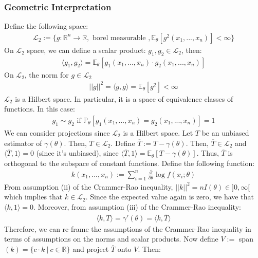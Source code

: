 \documentclass[11pt]{scrartcl}
\newcommand{\R}[0]{\mathbb{R}}
\theoremstyle{definition}
\theoremstyle{remark}
\newcommand{\EXth}[1]{\mathbb{E}_\theta \left[ #1 \right]}
\newcommand{\Ltwo}[0]{\mathcal{L}_2}
\begin{document}
{\subsubsection{Geometric Interpretation}
Define the following space: 
\begin{align*} 
	\mathcal{L}_2 := \{ g: \R^n \rightarrow \R, \text{ borel measurable }, \EXth{g^2(x_1,..., x_n)} < \infty  \} 
\end{align*}
On $\Ltwo$ space, we can define a scalar product: $g_1, g_2 \in \Ltwo$, then: 
\begin{align*}
	\langle g_1, g_2 \rangle = \EXth{g_1(x_1, ..., x_n) \cdot g_2 (x_1, ..., x_n) }	
\end{align*}
On $\Ltwo$, the norm for $g \in \Ltwo$
\begin{align*}
		||g||^2 = \langle g, g \rangle = \EXth{g^2} < \infty 
\end{align*}
$\Ltwo$ is a Hilbert space. In particular, it is a space of equivalence classes of functions. In this case: 
\begin{align*}
	g_1 \sim g_2 \text{ if } \mathbb{P}_\theta [ g_1(x_1, ..., x_n) = g_2(x_1,..., x_n)] = 1	
\end{align*}
We can consider projections since $\Ltwo$ is a Hilbert space. Let $T$ be an unbiased estimator of $\gamma (\theta)$. Then, $T \in \Ltwo$.  Define $\overline{T}:= T - \gamma(\theta)$. Then, $\overline{T} \in \Ltwo$ and $\langle \overline{T}, 1 \rangle =0$ (since it's unbiased), since $\langle \overline{T}, 1 \rangle = \EXth{T - \gamma(\theta)}$. Thus, $\overline{T}$ is orthogonal to the subspace of constant functions. Define the following function: 
\begin{align}
	k(x_1, ..., x_n) := \sum_{i=1}^n \frac{\partial}{\partial \theta} \log f(x_i; \theta) 
\end{align}
From assumption (ii) of the Crammer-Rao inequality, $||k||^2 = nI(\theta) \in ]0, \infty[$ which implies that $k \in \Ltwo$. Since the expected value again is zero, we have that $\langle k, 1 \rangle = 0$. Moreover, from assumption (iii) of the Crammer-Rao inequality:
\begin{align*}
	\langle k, T \rangle = \gamma ' (\theta) = \langle k, \overline{T} \rangle 	
\end{align*}
Therefore, we can re-frame the assumptions of the Crammer-Rao inequality in terms of assumptions on the norms and scalar products.  Now define $V:= $ span$(k) = \{ c \cdot  k\ |\ c \in \R \} $ and project $\overline{T}$ onto $V$. Then: 
\begin{align*}

\end{align*}}
\end{document}
